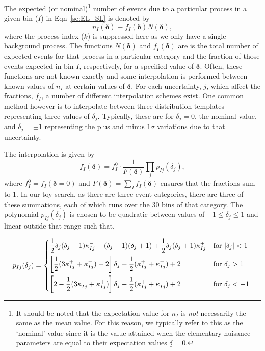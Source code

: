 \documentclass[11pt]{article}
\begin{document}
The expected (or nominal)\footnote{It should be noted that the expectation value for $n_{I}$ is \emph{not} necessarily the same as the mean value. For this reason, we typically refer
to this as the `nominal' value since it is the value attained when the elementary nuisance parameters are equal to their expectation values $\underline{\delta}=0$.} number of events due to a particular process in a given bin ($I$) in Eqn~\ref{se:EL_SL} is denoted by
%
\begin{equation}
  n_{I}(\bm{\delta}) \equiv %
  f_{I}(\bm{\delta}) N(\bm{\delta}),
\end{equation}
%
where the process index ($k$) is suppressed here as we only have a single background process. The functions $N(\bm{\delta})$ and  $f_{I}(\bm{\delta})$ are is the total number of expected events for that process in a particular
category and the fraction of those events expected in bin $I$, respectively, for a specified value of $\bm{\delta}$. Often, these functions are not known exactly and some interpolation is performed between known
values of $n_{I}$ at certain values of $\bm{\delta}$. For each uncertainty, $j$, which affect the fractions, $f_{I}$, a number of different interpolation schemes exist. One common method however is to interpolate between
three distribution templates representing three values of $\delta_{j}$. Typically, these are for $\delta_{j}=0$, the nominal value, and $\delta_{j}=\pm1$ representing the plus and minus $1\sigma$ variations due to that uncertainty.

The interpolation is given by
%
\begin{equation}
 f_{I}(\bm{\delta}) = f_{I}^{0}\cdot\frac{1}{F(\bm{\delta})} \prod_{j} p_{Ij}(\delta_{j}),
 \label{eqn:frac_function}
\end{equation}
%
where $f_{I}^{0}=f_{I}(\bm{\delta}=0)$ and $F(\bm{\delta})=\sum_{I}f_{I}(\bm{\delta})$ ensures that the fractions sum to 1. In our toy search, as there are three event categories,
there are three of these summations, each of which runs over the 30 bins of that category. The polynomial $p_{Ij}(\delta_{j})$ is chosen to be quadratic between values of $-1 \leq \delta_{j} \leq 1$
and linear outside that range such that,

\begin{equation}
 p_{Ij}(\delta_{j}) = \begin{dcases*}
 		\frac{1}{2} \delta_{j}(\delta_{j}-1) \kappa_{Ij}^{-}  -(\delta_{j}-1)(\delta_{j}+1) + \frac{1}{2}\delta_{j}(\delta_{j}+1)\kappa_{Ij}^{+} & for $|\delta_{j}|<1$ \\
        \left[ \frac{1}{2}(3\kappa_{Ij}^{+} + \kappa_{Ij}^{-})-2\right]\delta_{j} - \frac{1}{2}(\kappa_{Ij}^{+}+\kappa_{Ij}^{-})+2 & for $\delta_{j}>1$ \\
         \left[2-\frac{1}{2}(3\kappa_{Ij}^{-} + \kappa_{Ij}^{+})\right]\delta_{j} - \frac{1}{2}(\kappa_{Ij}^{+}+\kappa_{Ij}^{-})+2 & for $\delta_{j}<-1$ \\
    \end{dcases*}
\end{equation}
\end{document}
